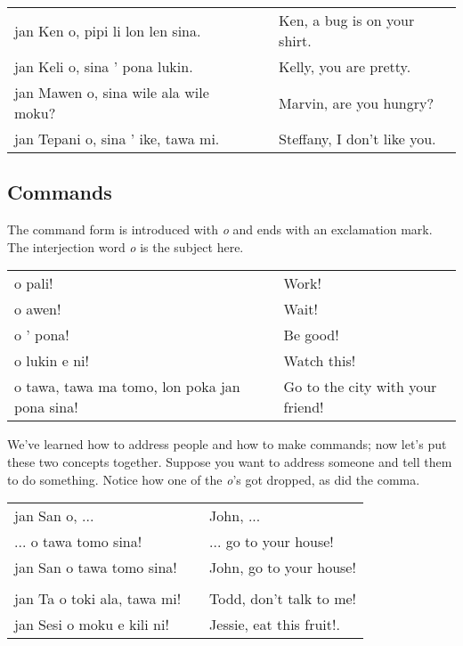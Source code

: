 \begin{supertabular}{p{5,5cm}|ll}
    jan Ken o, pipi li lon len sina.      &  & Ken, a bug is on your shirt. \\
    jan Keli o, sina ' pona lukin.        &  & Kelly, you are pretty.       \\
    jan Mawen o, sina wile ala wile moku? &  & Marvin, are you hungry?      \\
    jan Tepani o, sina ' ike, tawa mi.    &  & Steffany, I don't like you.  \\
\end{supertabular}
%
\subsection*{Commands}
%
The command form is introduced with \textit{o} and ends with an exclamation mark.
The interjection word \textit{o} is the subject here.

\begin{supertabular}{p{5,5cm}|ll}
    o pali!                                       &  & Work!                            \\
    o awen!                                       &  & Wait!                            \\
    o ' pona!                                     &  & Be good!                         \\
    o lukin e ni!                                 &  & Watch this!                      \\
    o tawa, tawa ma tomo, lon poka jan pona sina! &  & Go to the city with your friend! \\
\end{supertabular}

We've learned how to address people and how to make commands; now let's put these two concepts together.
Suppose you want to address someone and tell them to do something.
Notice how one of the \textit{o}'s got dropped, as did the comma.

\begin{supertabular}{p{5,5cm}|ll}
    jan San o, ...              &  & John, ...                \\ %
    ... o tawa tomo sina!       &  & ... go to your house!    \\ %
    jan San o tawa tomo sina!   &  & John, go to your house!  \\
                                &  &                          \\ %
    jan Ta o toki ala, tawa mi! &  & Todd, don't talk to me!  \\
    jan Sesi o moku e kili ni!  &  & Jessie, eat this fruit!. \\
\end{supertabular}

